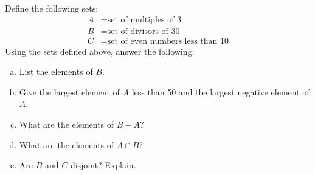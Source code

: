 \documentclass[11pt,letterpaper]{article}
\begin{document}
\newpage



 Define the following sets:
	\[
	\begin{aligned}
	A&= \text{set of multiples of 3} \\
	B&= \text{set of divisors of 30} \\
	C&= \text{set of even numbers less than 10} 
	\end{aligned}
	\]
Using the sets defined above, answer the following:
        \begin{enumerate}[(a)]
        \item List the elements of $B$.
        \item Give the largest element of $A$ less than 50 and the largest negative element of $A$.
        \item What are the elements of $B - A$?
        \item What are the elements of $A \cap B$?
        \item Are $B$ and $C$ disjoint? Explain. 
        \end{enumerate} \pspace
\end{document}
